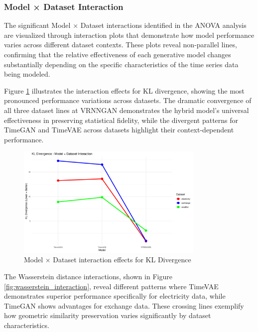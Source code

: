 \documentclass{article}
\begin{document}
\subsubsection{Model × Dataset Interaction}

The significant Model × Dataset interactions identified in the ANOVA analysis are visualized through interaction plots that demonstrate how model performance varies across different dataset contexts. These plots reveal non-parallel lines, confirming that the relative effectiveness of each generative model changes substantially depending on the specific characteristics of the time series data being modeled.

Figure \ref{fig:kl_interaction} illustrates the interaction effects for KL divergence, showing the most pronounced performance variations across datasets. The dramatic convergence of all three dataset lines at VRNNGAN demonstrates the hybrid model's universal effectiveness in preserving statistical fidelity, while the divergent patterns for TimeGAN and TimeVAE across datasets highlight their context-dependent performance.

\begin{figure}[H]
\centering
\includegraphics[width=0.8\textwidth]{assets/interaction_kl.png}
\caption{Model × Dataset interaction effects for KL Divergence}
\label{fig:kl_interaction}
\end{figure}

The Wasserstein distance interactions, shown in Figure \ref{fig:wasserstein_interaction}, reveal different patterns where TimeVAE demonstrates superior performance specifically for electricity data, while TimeGAN shows advantages for exchange data. These crossing lines exemplify how geometric similarity preservation varies significantly by dataset characteristics.
\end{document}
